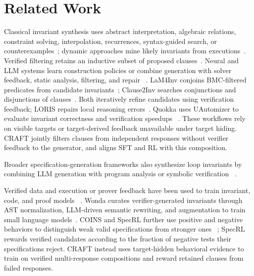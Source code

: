 \section{Related Work}\label{sec:related}

Classical invariant synthesis uses abstract interpretation, algebraic relations,
constraint solving, interpolation, recurrences, syntax-guided search, or
counterexamples~\citep{cousot1977abstract,cousot1978automatic,karr1976affine,
colon2003linear,sankaranarayanan2004non,gulwani2008program,gupta2009invgen,
mcmillan2003interpolation,kincaid2017compositional,alur2013sygus,garg2014ice};
dynamic approaches mine likely invariants from executions~\citep{daikon}.
Verified filtering retains an inductive subset of proposed
clauses~\citep{flanagan2001houdini}.  Neural and LLM systems learn construction
policies or combine generation with solver feedback, static analysis,
filtering, and repair
~\citep{si2018learning,si2020code2inv,ryan2020cln2inv,yao2020gcln,
yu2023lipus,kamath2023finding,chakraborty2023ranking,
liu2024acinv,
wu2024lemur,first2023baldur}.  LaM4Inv conjoins BMC-filtered predicates
from candidate invariants~\citep{wu2024lam4inv}; Clause2Inv searches
conjunctions and disjunctions of clauses~\citep{cao2025clause2inv}.
Both iteratively refine candidates using verification feedback; LORIS repairs
local reasoning errors~\citep{li2026loris}. Quokka uses UAutomizer
to evaluate invariant correctness and verification speedups
~\citep{wei2025invbench}.  These workflows rely on visible targets or
target-derived feedback unavailable under target hiding.
CRAFT jointly filters clauses from independent responses without verifier
feedback to the generator, and aligns SFT and RL with this composition.

Broader specification-generation frameworks also synthesize loop invariants
by combining LLM generation with
program analysis or symbolic verification
~\citep{wen2024enchanting,yang2026sespec,ma2025specgen}.

Verified data and execution or prover feedback have been used to train
invariant, code, and proof models
~\citep{wei2025invbench,pinto2026notall,le2022coderl,yan2025reform}.
Wonda curates verifier-generated invariants through AST normalization,
LLM-driven semantic rewriting, and augmentation to train small language
models~\citep{pinto2026notall}.
COINS and SpecRL further use positive and negative behaviors to distinguish
weak valid specifications from stronger ones
~\citep{yang2026coins,huang2026specrl}; SpecRL rewards verified candidates
according to the fraction of negative tests their specifications reject.
CRAFT instead uses target-hidden behavioral evidence to train on verified
multi-response compositions and reward retained clauses from failed responses.

